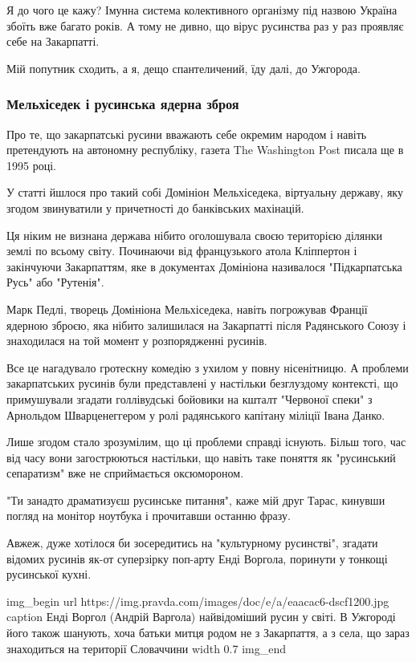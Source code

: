 Я до чого це кажу? Імунна система колективного організму під назвою Україна
збоїть вже багато років. А тому не дивно, що вірус русинства раз у раз проявляє
себе на Закарпатті.

Мій попутник сходить, а я, дещо спантеличений, їду далі, до Ужгорода.

\subsubsection{Мельхіседек і русинська ядерна зброя}

Про те, що закарпатські русини вважають себе окремим народом і навіть
претендують на автономну республіку, газета The Washington Post писала ще в
1995 році.

У статті йшлося про такий собі Домініон Мельхіседека, віртуальну державу, яку
згодом звинуватили у причетності до банківських махінацій.

Ця ніким не визнана держава нібито оголошувала своєю територією ділянки землі
по всьому світу. Починаючи від французького атола Кліппертон і закінчуючи
Закарпаттям, яке в документах Домініона називалося "Підкарпатська Русь" або
"Рутенія".

Марк Педлі, творець Домініона Мельхіседека, навіть погрожував Франції ядерною
зброєю, яка нібито залишилася на Закарпатті після Радянського Союзу і
знаходилася на той момент у розпорядженні русинів.

Все це нагадувало гротескну комедію з ухилом у повну нісенітницю. А проблеми
закарпатських русинів були представлені у настільки безглуздому контексті, що
примушували згадати голлівудські бойовики на кшталт "Червоної спеки" з
Арнольдом Шварценеггером у ролі радянського капітану міліції Івана Данко. 

Лише згодом стало зрозумілим, що ці проблеми справді існують. Більш того, час
від часу вони загострюються настільки, що навіть таке поняття як "русинський
сепаратизм" вже не сприймається оксюмороном.

"Ти занадто драматизуєш русинське питання", \textemdash каже мій друг Тарас, кинувши
погляд на монітор ноутбука і прочитавши останню фразу.

Авжеж, дуже хотілося би зосередитись на "культурному русинстві", згадати
відомих русинів як-от суперзірку поп-арту Енді Воргола, поринути у тонкощі
русинської кухні.

\ifcmt
img_begin 
    url https://img.pravda.com/images/doc/e/a/eaacac6-dscf1200.jpg
    caption Енді Воргол (Андрій Варгола) \textemdash найвідоміший русин у світі. В Ужгороді його також шанують, хоча батьки митця родом не з Закарпаття, а з села, що зараз знаходиться на території Словаччини
    width 0.7
img_end
\fi

